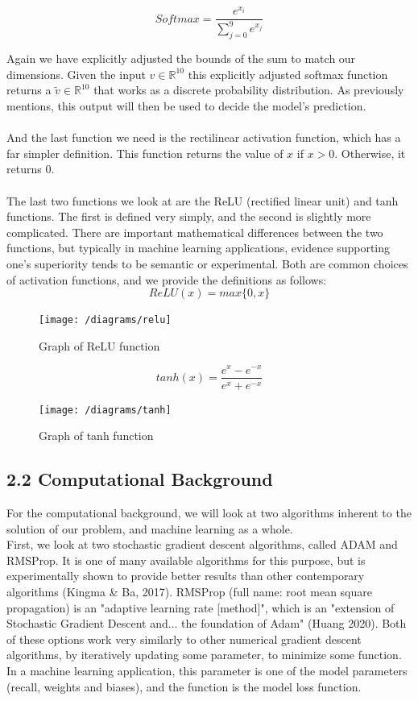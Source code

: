 \documentclass{article}
\begin{document}
\[Softmax = \frac{e^{x_i}}{\sum_{j=0}^9 e^{x_j}}\]

Again we have explicitly adjusted the bounds of the sum to match our dimensions. Given the input $v\in \mathbb{R}^{10}$ this explicitly adjusted softmax function returns a $\tilde v \in \mathbb{R}^{10}$ that works as a discrete probability distribution. As previously mentions, this output will then be used to decide the model's prediction.\\\\

And the last function we need is the rectilinear activation function, which has a far simpler definition. This function returns the value of $x$ if $x > 0$. Otherwise, it returns $0$.\\\\

The last two functions we look at are the ReLU (rectified linear unit) and tanh functions. The first is defined very simply, and the second is slightly more complicated. There are important mathematical differences between the two functions, but typically in machine learning applications, evidence supporting one's superiority tends to be semantic or experimental. Both are common choices of activation functions, and we provide the definitions as follows:
\[ReLU(x) = max\{0, x\}\]
\begin{figure}[H]
\texttt{[image: /diagrams/relu]}
\caption{Graph of ReLU function}
\end{figure}
\[tanh(x) = \frac{e^{x} - e^{-x}}{e^{x}+e^{-x}}\]
\begin{figure}[H]
\texttt{[image: /diagrams/tanh]}
\caption{Graph of tanh function}
\end{figure}

\subsection*{2.2 Computational Background}

For the computational background, we will look at two algorithms inherent to the solution of our problem, and machine learning as a whole.\\

First, we look at two stochastic gradient descent algorithms, called ADAM and RMSProp. It is one of many available algorithms for this purpose, but is experimentally shown to provide better results than other contemporary algorithms (Kingma \& Ba, 2017). RMSProp (full name: root mean square propagation) is an "adaptive learning rate [method]", which is an "extension of Stochastic Gradient Descent and... the foundation of Adam" (Huang 2020). Both of these options work very similarly to other numerical gradient descent algorithms, by iteratively updating some parameter, to minimize some function. In a machine learning application, this parameter is one of the model parameters (recall, weights and biases), and the function is the model loss function.\\\\
\end{document}
